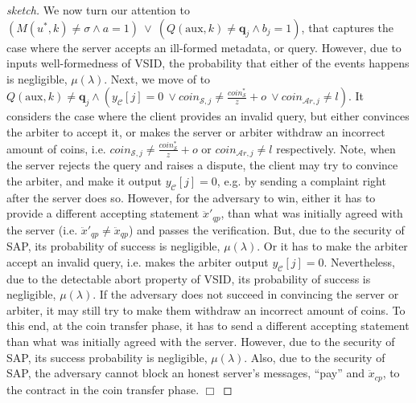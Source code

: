 \begin{proof}[sketch]
    We now turn our attention to $(M(u^{\scriptscriptstyle *},k)\neq \sigma \wedge a=1)\ \vee\ (Q(\text{aux},k)\neq \bm{q}_{\scriptscriptstyle j} \wedge b_{\scriptscriptstyle j}=1)$,   that captures the case where the server accepts an ill-formed metadata, or query. However, due to inputs well-formedness of VSID, the probability that either of the events happens is negligible, $\mu(\lambda)$. Next, we move of to      $Q(\text{aux},k)\neq \bm{q}_{\scriptscriptstyle j} \wedge
  (y_{\scriptscriptstyle\mathcal{C}}[j]=0 \ \vee  coin_{\scriptscriptstyle\mathcal{S},j}\neq \frac{coin_{\scriptscriptstyle\mathcal S}^{\scriptscriptstyle*}}{z}+o \ \vee  coin_{\scriptscriptstyle\mathcal{A}r,j}\neq l)$.  It considers the case where the client provides an invalid query, but  either convinces the arbiter to accept it, or  makes the server or arbiter  withdraw an incorrect amount of coins, i.e. $coin_{\scriptscriptstyle\mathcal{S},j}\neq \frac{coin_{\scriptscriptstyle\mathcal S}^{\scriptscriptstyle*}}{z}+o$ or  $coin_{\scriptscriptstyle\mathcal{A}r,j}\neq l$ respectively. Note, when the server rejects the query and raises a dispute, the client may try to convince the arbiter, and make it output $y_{\scriptscriptstyle \mathcal C}[j]=0$, e.g. by sending a complaint right after the server does so. However, for the adversary to win, either it has to provide a different accepting statement $\ddot{x}'_{\scriptscriptstyle qp}$, than what was initially agreed with the server (i.e. $\ddot{x}'_{\scriptscriptstyle qp}\neq \ddot{x}_{\scriptscriptstyle qp}$) and passes the verification. But,  due to the security of SAP, its probability of success is negligible, $\mu(\lambda)$. Or it has to make the arbiter  accept an invalid query, i.e. makes the arbiter output $y_{\scriptscriptstyle\mathcal{C}}[j]=0$. Nevertheless, due to the detectable abort property of VSID, its probability of success is  negligible, $\mu(\lambda)$. If the adversary does not succeed in convincing the server or arbiter, it may still try to  make them withdraw an incorrect amount of coins. To this end, at the coin transfer phase, it has to send a  different accepting statement  than what was initially agreed with the server. However, due to the security of SAP, its  success probability is negligible, $\mu(\lambda)$. Also, due to the security of SAP, the adversary cannot block an honest server's  messages, ``pay'' and $\ddot{x}_{\scriptscriptstyle cp}$, to the contract in the coin transfer phase.
 \hfill\(\Box\)\end{proof}
  
  
  


